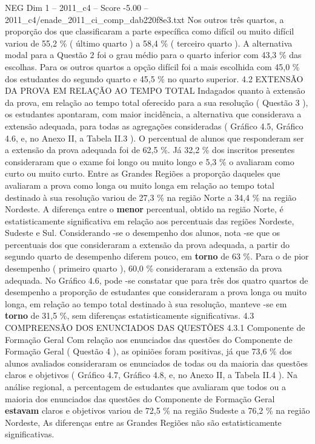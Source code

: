 \begin{textsample}{NEG Dim 1 – 2011\_c4 – Score -5.00 – 2011\_c4/enade\_2011\_ci\_comp\_dab220f8e3.txt}
Nos outros três quartos, a proporção dos que classificaram a parte específica como difícil ou muito difícil variou de 55,2 \% ( último quarto ) a 58,4 \% ( terceiro quarto ).
A alternativa modal para a Questão 2 foi o grau médio para o quarto inferior com 43,3 \% das escolhas.
Para os outros quartos a opção difícil foi a mais escolhida com 45,0 \% dos estudantes do segundo quarto e 45,5 \% no quarto superior. 4.2 EXTENSÃO DA PROVA EM RELAÇÃO AO TEMPO TOTAL Indagados quanto à extensão da prova, em relação ao tempo total oferecido para a sua resolução ( Questão 3 ), os estudantes apontaram, com maior incidência, a alternativa que considerava a extensão adequada, para todas as agregações consideradas ( Gráfico 4.5, Gráfico 4.6, e, no Anexo II, a Tabela II.3 ).
O percentual de alunos que responderam ser a extensão da prova adequada foi de 62,5 \%.
Já 32,2 \% dos inscritos presentes consideraram que o exame foi longo ou muito longo e 5,3 \% o avaliaram como curto ou muito curto.
Entre as Grandes Regiões a proporção daqueles que avaliaram a prova como longa ou muito longa em relação ao tempo total destinado à sua resolução variou de 27,3 \% na região Norte a 34,4 \% na região Nordeste.
A diferença entre o \textbf{menor} percentual, obtido na região Norte, é estatisticamente significativa em relação aos percentuais das regiões Nordeste, Sudeste e Sul.
Considerando -se o desempenho dos alunos, nota -se que os percentuais dos que consideraram a extensão da prova adequada, a partir do segundo quarto de desempenho diferem pouco, em \textbf{torno} de 63 \%.
Para o de pior desempenho ( primeiro quarto ), 60,0 \% consideraram a extensão da prova adequada.
No Gráfico 4.6, pode -se constatar que para três dos quatro quartos de desempenho a proporção de estudantes que consideraram a prova longa ou muito longa, em relação ao tempo total destinado à sua resolução, manteve -se em \textbf{torno} de 31,5 \%, sem diferenças estatisticamente significativas. 4.3 COMPREENSÃO DOS ENUNCIADOS DAS QUESTÕES 4.3.1 Componente de Formação Geral Com relação aos enunciados das questões do Componente de Formação Geral ( Questão 4 ), as opiniões foram positivas, já que 73,6 \% dos alunos avaliados consideraram os enunciados de todas ou da maioria das questões claros e objetivos ( Gráfico 4.7, Gráfico 4.8, e, no Anexo II, a Tabela II.4 ).
Na análise regional, a percentagem de estudantes que avaliaram que todos ou a maioria dos enunciados das questões do Componente de Formação Geral \textbf{estavam} claros e objetivos variou de 72,5 \% na região Sudeste a 76,2 \% na região Nordeste, As diferenças entre as Grandes Regiões não são estatisticamente significativas.

\end{textsample}
